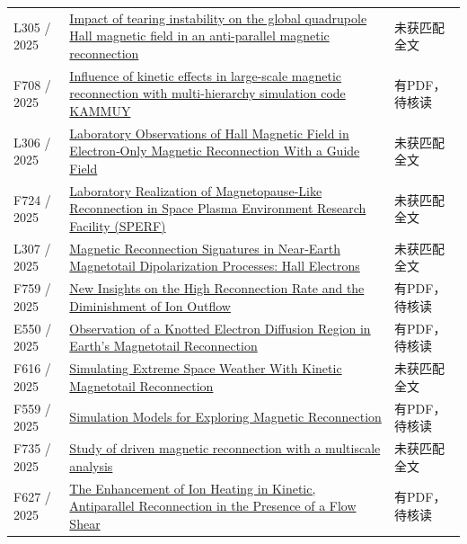 \begin{longtable}{P{24mm}P{97mm}P{27mm}}
L305 / 2025 & \href{https://doi.org/10.1063/5.0259029}{Impact of tearing instability on the global quadrupole Hall magnetic field in an anti-parallel magnetic reconnection} & 未获匹配全文\\

F708 / 2025 & \href{https://doi.org/10.1093/pasj/psaf123}{Influence of kinetic effects in large-scale magnetic reconnection with multi-hierarchy simulation code KAMMUY} & 有PDF，待核读\\

L306 / 2025 & \href{https://doi.org/10.1029/2024gl114151}{Laboratory Observations of Hall Magnetic Field in Electron‐Only Magnetic Reconnection With a Guide Field} & 未获匹配全文\\

F724 / 2025 & \href{https://doi.org/10.1029/2025gl117351}{Laboratory Realization of Magnetopause‐Like Reconnection in Space Plasma Environment Research Facility (SPERF)} & 未获匹配全文\\

L307 / 2025 & \href{https://doi.org/10.1029/2025ja033875}{Magnetic Reconnection Signatures in Near‐Earth Magnetotail Dipolarization Processes: Hall Electrons} & 未获匹配全文\\

F759 / 2025 & \href{https://doi.org/10.1029/2024gl113889}{New Insights on the High Reconnection Rate and the Diminishment of Ion Outflow} & 有PDF，待核读\\

E550 / 2025 & \href{https://doi.org/10.1029/2025gl117612}{Observation of a Knotted Electron Diffusion Region in Earth's Magnetotail Reconnection} & 有PDF，待核读\\

F616 / 2025 & \href{https://doi.org/10.1029/2024sw004057}{Simulating Extreme Space Weather With Kinetic Magnetotail Reconnection} & 未获匹配全文\\

F559 / 2025 & \href{https://doi.org/10.1007/s11214-025-01210-5}{Simulation Models for Exploring Magnetic Reconnection} & 有PDF，待核读\\

F735 / 2025 & \href{https://doi.org/10.1080/10420150.2025.2475389}{Study of driven magnetic reconnection with a multiscale analysis} & 未获匹配全文\\

F627 / 2025 & \href{https://doi.org/10.3847/1538-4357/ae2014}{The Enhancement of Ion Heating in Kinetic,  Antiparallel Reconnection in the Presence of a Flow Shear} & 有PDF，待核读\\


\end{longtable}

